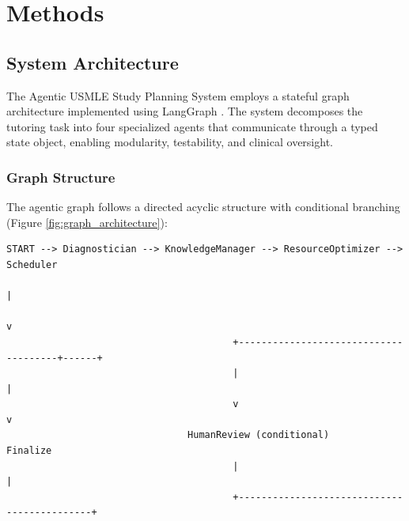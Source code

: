 \section{Methods}

\subsection{System Architecture}

The Agentic USMLE Study Planning System employs a stateful graph architecture implemented using LangGraph \cite{langgraph2024}. The system decomposes the tutoring task into four specialized agents that communicate through a typed state object, enabling modularity, testability, and clinical oversight.

\subsubsection{Graph Structure}

The agentic graph follows a directed acyclic structure with conditional branching (Figure \ref{fig:graph_architecture}):

\begin{verbatim}
START --> Diagnostician --> KnowledgeManager --> ResourceOptimizer --> Scheduler
                                                                               |
                                                                               v
                                        +--------------------------------------+------+
                                        |                                            |
                                        v                                            v
                                HumanReview (conditional)                       Finalize
                                        |                                            |
                                        +--------------------------------------------+
\end{verbatim}

